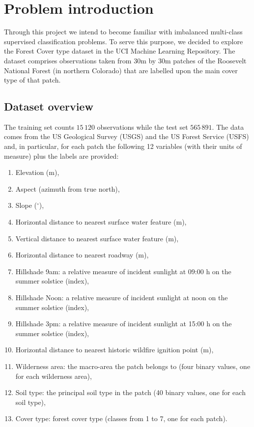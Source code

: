 \chapter{Problem introduction}
Through this project we intend to become familiar with imbalanced multi-class supervised classification problems. To serve this purpose, we decided to explore the Forest Cover type dataset in the UCI Machine Learning Repository. The dataset comprises observations taken from 30m by 30m patches of the Roosevelt National Forest (in northern Colorado) that are labelled upon the main cover type of that patch.

\section{Dataset overview}
The training set counts $15\,120$ observations while the test set $565\,891$. The data comes from the US Geological Survey
(USGS) and the US Forest Service (USFS) and, in particular, for each patch the following 12 variables (with their units of measure) plus the labels are provided:
\begin{enumerate}
	\item Elevation (m),
	\item Aspect (azimuth from true north),
	\item Slope ($^{\circ}$),
	\item Horizontal distance to nearest surface water feature (m),
	\item Vertical distance to nearest surface water feature (m),
	\item Horizontal distance to nearest roadway (m),
	\item Hillshade 9am: a relative measure of incident sunlight at 09:00 h on the summer solstice (index),
	\item Hillshade Noon: a relative measure of incident sunlight at noon on the summer solstice (index),
	\item Hillshade 3pm: a relative measure of incident sunlight at 15:00 h on the summer solstice (index),
	\item Horizontal distance to nearest historic wildfire ignition point (m),
	\item Wilderness area: the macro-area the patch belongs to (four binary values, one for each wilderness area),
	\item Soil type: the principal soil type in the patch (40 binary values, one for each soil type),
	\item Cover type: forest cover type (classes from 1 to 7, one for each patch).
\end{enumerate}

